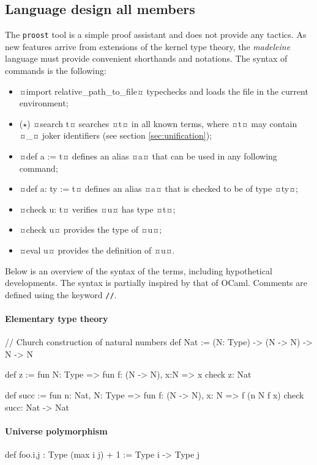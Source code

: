 \documentclass[twocolumn]{article}
\newcommand{\members}[1]{\texorpdfstring{\hfill\scriptsize #1}{}}
\newcommand{\etun}{{\color{Green} ($\star$)} }
\begin{document}
\subsection{Language design \members{all members}} The \texttt{proost} tool is a
simple proof assistant and does not provide any tactics. As new features arrive
from extensions of the kernel type theory, the \emph{madeleine} language must
provide convenient shorthands and notations. The syntax of commands is the
following:
\begin{itemize}
	\item ¤import relative_path_to_file¤ typechecks
		and loads the file in the current environment;
	\item \etun ¤search t¤ searches ¤t¤ in all known terms, where ¤t¤ may contain
		¤_¤ joker identifiers (see section \ref{sec:unification});
	\item ¤def a := t¤
		defines an alias ¤a¤ that can be used in any following command;
	\item ¤def a: ty := t¤ defines an alias ¤a¤ that is checked to
		be of type ¤ty¤;
	\item ¤check u: t¤ verifies ¤u¤ has type ¤t¤;
  \item ¤check u¤ provides the type of ¤u¤;
  \item ¤eval u¤ provides the definition of ¤u¤.
\end{itemize}

Below is an overview of the syntax of the terms, including hypothetical
developments. The syntax is partially inspired by that of OCaml. Comments are
defined using the keyword \texttt{//}.

\paragraph{Elementary type theory}
\phantom{hello}
\begin{proost}
// Church construction of natural numbers
def Nat :=
  (N: Type) -> (N -> N) -> N -> N

def z := fun N: Type =>
  fun f: (N -> N), x:N => x
check z: Nat

def succ := fun n: Nat, N: Type =>
  fun f: (N -> N), x: N =>
    f (n N f x)
check succ: Nat -> Nat
\end{proost}

\paragraph{Universe polymorphism}
\phantom{hello}
\begin{proost}
def foo.{i,j} : Type (max i j) + 1
:= Type i -> Type j
\end{proost}
\end{document}
